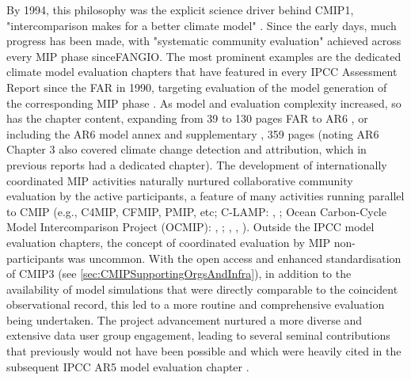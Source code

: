 \documentclass[gmd, preprint]{copernicus}
\begin{document}
By 1994, this philosophy was the explicit science driver behind CMIP1, "intercomparison makes for a better climate model" \citep{meehl_intercomparison_1997}. Since the early days, much progress has been made, with "systematic community evaluation" achieved across every MIP phase sinceFANGIO. The most prominent examples are the dedicated climate model evaluation chapters that have featured in every IPCC Assessment Report since the FAR in 1990, targeting evaluation of the model generation of the corresponding MIP phase \citep[e.g.,][]{gates_validation_1990,gates_climate_1996,mcavaney_model_2001,randall_climate_2007,flato_evaluation_2013,eyring_human_2021}. As model and evaluation complexity increased, so has the chapter content, expanding from 39 to 130 pages FAR to AR6  \citep{gates_validation_1990,eyring_human_2021}, or including the AR6 model annex \citep{gutierrez_models_2021} and supplementary \citep{eyring_human_2021-1}, 359 pages (noting AR6 Chapter 3 also covered climate change detection and attribution, which in previous reports had a dedicated chapter). The development of internationally coordinated MIP activities naturally nurtured collaborative community evaluation by the active participants, a feature of many activities running parallel to CMIP (e.g., C4MIP, CFMIP, PMIP, etc; C-LAMP: \citeauthor{hoffman_results_2007}, \citeyear{hoffman_results_2007}; Ocean Carbon-Cycle Model Intercomparison Project (OCMIP): \citeauthor{orr_ocean_1999}, \citeyear{orr_ocean_1999}; \citeauthor{dutay_evaluation_2002}, \citeyear{dutay_evaluation_2002}, 
\citeyear{dutay_evaluation_2004}). Outside the IPCC model evaluation chapters, the concept of coordinated evaluation by MIP non-participants was uncommon. With the open access and enhanced standardisation of CMIP3 (see \autoref{sec:CMIPSupportingOrgsAndInfra}), in addition to the availability of model simulations that were directly comparable to the coincident observational record, this led to a more routine and comprehensive evaluation being undertaken. The project advancement nurtured a more diverse and extensive data user group engagement, leading to several seminal contributions that previously would not have been possible \citep{gleckler_performance_2008,eyring_assessment_2006,waugh_quantitative_2008} and which were heavily cited in the subsequent IPCC AR5 model evaluation chapter \citep{flato_evaluation_2013}.
\end{document}
